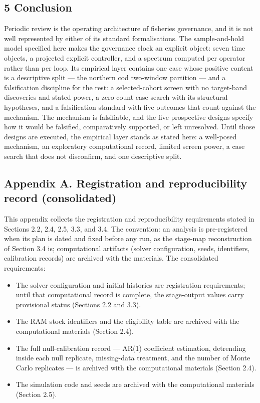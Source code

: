 \documentclass[11pt]{article}
\providecommand{\tightlist}{\setlength{\itemsep}{0pt}\setlength{\parskip}{0pt}}
\begin{document}
\subsection{5 Conclusion}\label{conclusion}

Periodic review is the operating architecture of fisheries governance,
and it is not well represented by either of its standard formalisations.
The sample-and-hold model specified here makes the governance clock an
explicit object: seven time objects, a projected explicit controller,
and a spectrum computed per operator rather than per loop. Its empirical
layer contains one case whose
positive content is a descriptive split --- the northern cod two-window
partition --- and a falsification discipline for the rest: a selected-cohort
screen with no target-band discoveries and stated power, a zero-count
case search with its structural hypotheses, and a falsification standard
with five outcomes that count against the mechanism. The mechanism is
falsifiable, and the five prospective designs specify how it would be
falsified, comparatively supported, or left unresolved. Until those
designs are executed, the empirical layer stands as stated here: a
well-posed mechanism, an exploratory computational record, limited
screen power, a case search that does not disconfirm, and one
descriptive split.

\subsection{Appendix A. Registration and reproducibility record
(consolidated)}\label{appendix-a.-registration-and-reproducibility-record-consolidated}

This appendix collects the registration and reproducibility requirements stated in Sections 2.2, 2.4, 2.5, 3.3, and 3.4. The convention: an analysis is pre-registered when its plan is dated and fixed before any run, as the stage-map reconstruction of Section 3.4 is; computational artifacts (solver configuration, seeds, identifiers, calibration records) are archived with the materials. The consolidated requirements:

\begin{itemize}
\tightlist
\item
  The solver configuration and initial histories are
  registration requirements; until that computational record is complete,
  the stage-output values carry provisional status (Sections 2.2 and
  3.3).
\item
  The RAM stock identifiers and the eligibility table are
  archived with the computational materials (Section 2.4).
\item
  The full null-calibration record --- AR(1) coefficient estimation,
  detrending inside each null replicate, missing-data treatment, and the
  number of Monte Carlo replicates --- is archived with the computational materials (Section 2.4).
\item
  The simulation code and seeds are archived with the computational materials
  (Section 2.5).
\end{itemize}
\end{document}
